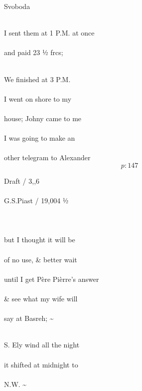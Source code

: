 \documentclass{report}
\begin{document}
	\par{
 	Svoboda\ \\\ \\
	}

	\par{
 	I sent them at 1 P.M. at once\ \\\ \\and paid 23 ½ frcs;\ \\\ \\
	}

	\par{
 	We finished at 3 P.M.\ \\\ \\I went on shore to my\ \\\ \\house; Johny came to me\ \\\ \\I was going to make an\ \\\ \\other telegram to Alexander\ \\
  \[p: 147 \]

	}



	\par{
 	Draft / 3,,6\ \\\ \\G.S.Piast / 19,004 ½\ \\\ \\\ \\\ \\but I thought it will be\ \\\ \\of no use, \& better wait\ \\\ \\until I get Père Pièrre’s answer\ \\\ \\\& see what my wife will\ \\\ \\say at Basreh; \~{}\ \\\ \\
	}

	\par{
 	S. Ely wind all the night\ \\\ \\it shifted at midnight to\ \\\ \\N.W. \~{}\ \\\ \\
	}
\end{document}
